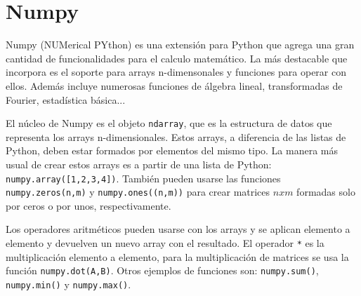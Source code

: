 \documentclass[a4paper,openright, 12pt]{book}
\begin{document}
\section{Numpy} \label{sec.numpy}
Numpy (NUMerical PYthon) es una extensión para Python que agrega una gran cantidad de funcionalidades para el calculo matemático. La más destacable que incorpora es el soporte para arrays n-dimensonales y funciones para operar con ellos. Además incluye numerosas funciones de álgebra lineal, transformadas de Fourier, estadística básica...

El núcleo de Numpy es el objeto \lstinline|ndarray|, que es la estructura de datos que representa los arrays n-dimensionales. Estos arrays, a diferencia de las listas de Python, deben estar formados por elementos del mismo tipo.
La manera más usual de crear estos arrays es a partir de una lista de Python: \lstinline|numpy.array([1,2,3,4])|. También pueden usarse las funciones \lstinline|numpy.zeros(n,m)| y \lstinline|numpy.ones((n,m))| para crear matrices $nxm$ formadas solo por ceros o por unos, respectivamente.

Los operadores aritméticos pueden usarse con los arrays y se aplican elemento a elemento y devuelven un nuevo array con el resultado.
El operador \lstinline|*| es la multiplicación elemento a elemento, para la multiplicación de matrices se usa la función \lstinline|numpy.dot(A,B)|.
Otros ejemplos de funciones son: \lstinline|numpy.sum()|, \lstinline|numpy.min()| y \lstinline|numpy.max()|.
\end{document}

